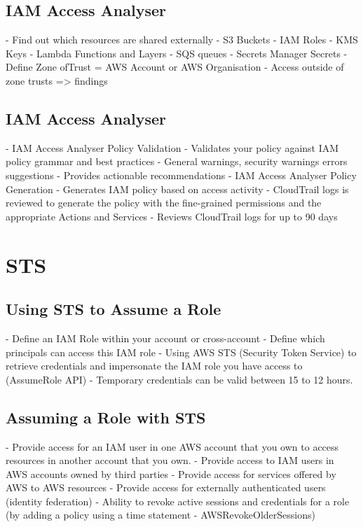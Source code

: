 \documentclass[11pt]{book}
\begin{document}
    \subsection{IAM Access Analyser}
    - Find out which resources are shared externally
    - S3 Buckets
    - IAM Roles
    - KMS Keys
    - Lambda Functions and Layers
    - SQS queues
    - Secrets Manager Secrets
    - Define Zone ofTrust = AWS Account or AWS Organisation
    - Access outside of zone trusts => findings

    \subsection{IAM Access Analyser}
    - IAM Access Analyser Policy Validation
    - Validates your policy against IAM policy grammar and best practices
    - General warnings, security warnings errors suggestions
    - Provides actionable recommendations
    - IAM Access Analyser Policy Generation
    - Generates IAM policy based on access activity
    - CloudTrail logs is reviewed to generate the policy with the fine-grained permissions and the appropriate Actions and Services
    - Reviews CloudTrail logs for up to 90 days


    \section{STS}

    \subsection{Using STS to Assume a Role}
    - Define an IAM Role within your account or cross-account
    - Define which principals can access this IAM role
    - Using AWS STS (Security Token Service) to retrieve credentials and impersonate the IAM role you have access to (AssumeRole API)
    - Temporary credentials can be valid between 15 to 12 hours.

    \subsection{Assuming a Role with STS}
    - Provide access for an IAM user in one AWS account that you own to access resources in another account that you own.
    - Provide access to IAM users in AWS accounts owned by third parties
    - Provide access for services offered by AWS to AWS resources
    - Provide access for externally authenticated users (identity federation)
    - Ability to revoke active sessions and credentials for a role (by adding a policy using a time statement - AWSRevokeOlderSessions)
\end{document}
